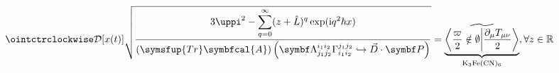 \documentclass{standalone}
\begin{document}
\Huge
$\displaystyle \ointctrclockwise\mathcal{D}[x(t)]\sqrt{\frac{\displaystyle3\uppi^2-\sum_{q=0}^{\infty}(z+\hat L)^{q}\exp(\mathrm{i}q^2 \hbar x)}{\displaystyle (\symsfup{Tr}\symbfcal{A})\left(\symbf\Lambda_{j_1j_2}^{i_1i_2}\Gamma_{i_1i_2}^{j_1j_2}\hookrightarrow\vec D\cdot \symbf P  \right)}}
=\underbrace{\widetilde{\left\langle \frac{\varpi}{2}\notin \emptyset\middle\vert \frac{\partial_\mu T_{\mu\nu}}{2}\right\rangle}}_{\mathrm{K}_3\mathrm{Fe}(\mathrm{CN})_6} ,\forall z \in \mathbb{R}$
\end{document}
